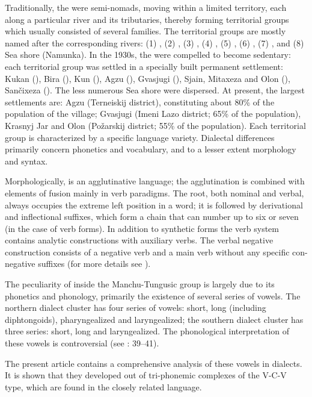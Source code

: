 \documentclass[output=paper,colorlinks,citecolor=brown]{langscibook}
\begin{document}
Traditionally, the  were semi-nomads, moving within a limited territory, each along a particular river and its tributaries, thereby forming territorial groups which usually consisted of several families. The territorial groups are mostly named after the corresponding rivers: (1) , (2) , (3) , (4) , (5) , (6) , (7) , and (8) Sea shore (Namunka). In the 1930s, the  were compelled to become sedentary: each territorial group was settled in a specially built permanent settlement: Kukan (), Bira (), Kun (), Agzu (), Gvasjugi (), Sjain, Mitaxeza and Olon (), Sančixeza (). The less numerous Sea shore  were dispersed. At present, the largest  settlements are: Agzu (Terneiskij district), constituting about 80\% of the population of the village; Gvasjugi (Imeni Lazo district; 65\% of the population), Krasnyj Jar and Olon (Požarskij district; 55\% of the population). Each territorial group is characterized by a specific language variety. Dialectal differences primarily concern phonetics and vocabulary, and to a lesser extent morphology and syntax.

Morphologically,  is an agglutinative language; the agglutination is combined with elements of fusion mainly in verb paradigms. The root, both nominal and verbal, always occupies the extreme left position in a word; it is followed by derivational and inflectional suffixes, which form a chain that can number up to six or seven (in the case of verb forms). In addition to synthetic forms the verb system contains analytic constructions with auxiliary verbs. The verbal negative construction consists of a negative verb and a main verb without any specific con-negative suffixes (for more details see \citealt{Hölzl2015}).

The peculiarity of  inside the Manchu-Tungusic group is largely due to its phonetics and phonology, primarily the existence of several series of vowels. The northern dialect cluster has four series of vowels: short, long (including diphtongoids), pharyngealized and laryngealized; the southern dialect cluster has three series: short, long and laryngealized. The phonological interpretation of these vowels is controversial (see \citealt{NikolaevaTolskaya2001}: 39--41).

The present article contains a comprehensive analysis of these vowels in  dialects. It is shown that they developed out of tri-phonemic complexes of the V-C-V type, which are found in the closely related  language.
\end{document}

